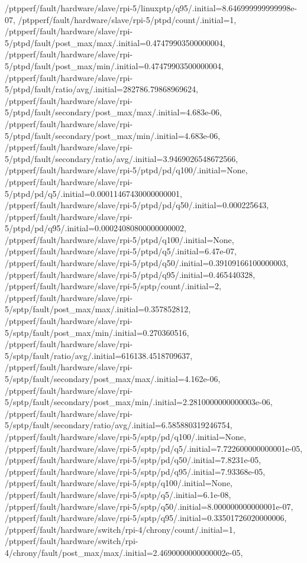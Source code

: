 {    /ptpperf/fault/hardware/slave/rpi-5/linuxptp/q95/.initial=8.646999999999998e-07,
    /ptpperf/fault/hardware/slave/rpi-5/ptpd/count/.initial=1,
    /ptpperf/fault/hardware/slave/rpi-5/ptpd/fault/post_max/max/.initial=0.47479903500000004,
    /ptpperf/fault/hardware/slave/rpi-5/ptpd/fault/post_max/min/.initial=0.47479903500000004,
    /ptpperf/fault/hardware/slave/rpi-5/ptpd/fault/ratio/avg/.initial=282786.79868969624,
    /ptpperf/fault/hardware/slave/rpi-5/ptpd/fault/secondary/post_max/max/.initial=4.683e-06,
    /ptpperf/fault/hardware/slave/rpi-5/ptpd/fault/secondary/post_max/min/.initial=4.683e-06,
    /ptpperf/fault/hardware/slave/rpi-5/ptpd/fault/secondary/ratio/avg/.initial=3.9469026548672566,
    /ptpperf/fault/hardware/slave/rpi-5/ptpd/pd/q100/.initial=None,
    /ptpperf/fault/hardware/slave/rpi-5/ptpd/pd/q5/.initial=0.00011467430000000001,
    /ptpperf/fault/hardware/slave/rpi-5/ptpd/pd/q50/.initial=0.000225643,
    /ptpperf/fault/hardware/slave/rpi-5/ptpd/pd/q95/.initial=0.00024080800000000002,
    /ptpperf/fault/hardware/slave/rpi-5/ptpd/q100/.initial=None,
    /ptpperf/fault/hardware/slave/rpi-5/ptpd/q5/.initial=6.47e-07,
    /ptpperf/fault/hardware/slave/rpi-5/ptpd/q50/.initial=0.39109166100000003,
    /ptpperf/fault/hardware/slave/rpi-5/ptpd/q95/.initial=0.465440328,
    /ptpperf/fault/hardware/slave/rpi-5/sptp/count/.initial=2,
    /ptpperf/fault/hardware/slave/rpi-5/sptp/fault/post_max/max/.initial=0.357852812,
    /ptpperf/fault/hardware/slave/rpi-5/sptp/fault/post_max/min/.initial=0.270360516,
    /ptpperf/fault/hardware/slave/rpi-5/sptp/fault/ratio/avg/.initial=616138.4518709637,
    /ptpperf/fault/hardware/slave/rpi-5/sptp/fault/secondary/post_max/max/.initial=4.162e-06,
    /ptpperf/fault/hardware/slave/rpi-5/sptp/fault/secondary/post_max/min/.initial=2.2810000000000003e-06,
    /ptpperf/fault/hardware/slave/rpi-5/sptp/fault/secondary/ratio/avg/.initial=6.585880319246754,
    /ptpperf/fault/hardware/slave/rpi-5/sptp/pd/q100/.initial=None,
    /ptpperf/fault/hardware/slave/rpi-5/sptp/pd/q5/.initial=7.722600000000001e-05,
    /ptpperf/fault/hardware/slave/rpi-5/sptp/pd/q50/.initial=7.8231e-05,
    /ptpperf/fault/hardware/slave/rpi-5/sptp/pd/q95/.initial=7.93368e-05,
    /ptpperf/fault/hardware/slave/rpi-5/sptp/q100/.initial=None,
    /ptpperf/fault/hardware/slave/rpi-5/sptp/q5/.initial=6.1e-08,
    /ptpperf/fault/hardware/slave/rpi-5/sptp/q50/.initial=8.000000000000001e-07,
    /ptpperf/fault/hardware/slave/rpi-5/sptp/q95/.initial=0.33501726020000006,
    /ptpperf/fault/hardware/switch/rpi-4/chrony/count/.initial=1,
    /ptpperf/fault/hardware/switch/rpi-4/chrony/fault/post_max/max/.initial=2.4690000000000002e-05,
}

